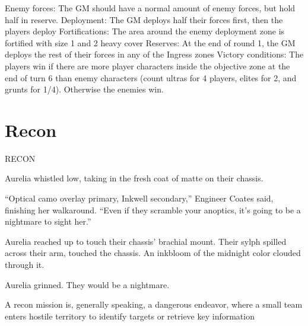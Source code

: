                                                              Enemy forces: The GM should have a
                                                             normal amount of enemy forces, but hold half
                                                             in reserve.
                                                             Deployment: The GM deploys half their
                                                            forces first, then the players deploy
                                                             Fortifications: The area around the enemy
                                                             deployment zone is fortified with size 1 and 2
                                                             heavy cover
                                                             Reserves: At the end of round 1, the GM
                                                             deploys the rest of their forces in any of the
                                                             Ingress zones
                                                            Victory conditions: The players win if there
                                                             are more player characters inside the
                                                             objective zone at the end of turn 6 than enemy
                                                            characters (count ultras for 4 players, elites for
2, and grunts for 1/4). Otherwise the enemies win.


\section{Recon}

RECON

         Aurelia whistled low, taking in the fresh coat of matte on their chassis.

          “Optical camo overlay primary, Inkwell secondary,” Engineer Coates said, finishing her walkaround.
          “Even if they scramble your anoptics, it’s going to be a nightmare to sight her.”

         Aurelia reached up to touch their chassis’ brachial mount. Their sylph spilled across their arm,
         touched the chassis. An inkbloom of the midnight color clouded through it.

         Aurelia grinned. They would be a nightmare.

A recon mission is, generally speaking, a dangerous endeavor, where a small team enters hostile
territory to identify targets or retrieve key information

